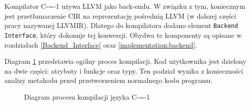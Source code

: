 Kompilator C-=-1 używa LLVM \cite{Lattner:MSThesis02} jako back-endu. W związku z tym, koniecznym jest przetłumaczenie CIR na reprezentację pośrednią LLVM (w dalszej części pracy nazywanej LLVMIR). Dlatego do kompilatora dodano element \lstinline{Backend Interface}, który dokonuje tej konwersji. Obydwa te komponenty są opisane w rozdziałach \ref{Backend_Interface} oraz \ref{implementation:backend}.

Diagram \ref{compilation_process_diagram} przedstawia ogólny proces kompilacji.
Kod użytkownika jest dzielony na dwie części: atrybuty i funkcje oraz typy.
Ten podział wynika z konieczności analizy metakodu przed przetworzeniem normalnego kodu programu.


\begin{figure}[]
  \caption{Diagram procesu kompilacji języka C-=-1}
  \label{compilation_process_diagram}

\end{figure}
